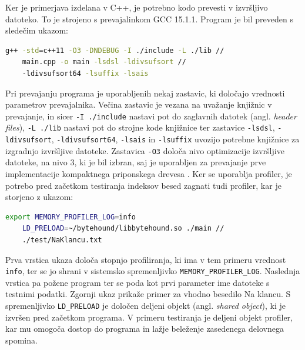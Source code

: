 Ker je primerjava izdelana v C++, je potrebno kodo prevesti v izvršljivo datoteko. To je strojeno s prevajalinkom GCC 15.1.1. Program je bil preveden s sledečim ukazom:
\begin{lstlisting}[language=bash]
    g++ -std=c++11 -O3 -DNDEBUG -I ./include -L ./lib // 
    main.cpp -o main -lsdsl -ldivsufsort //
    -ldivsufsort64 -lsuffix -lsais
\end{lstlisting}
\newpage
Pri prevajanju programa je uporabljenih nekaj zastavic, ki določajo vrednosti parametrov prevajalnika. Večina zastavic je vezana na uvažanje knjižnic v prevajanje, in sicer \verb|-I ./include| nastavi pot do zaglavnih datotek (angl. \textit{header files}), \verb|-L ./lib| nastavi pot do strojne kode knjižnice ter zastavice \verb|-lsdsl|, \verb|-ldivsufsort|, \verb|-ldivsufsort64|,  \verb|-lsais| in \verb|-lsuffix| uvozijo potrebne knjižnice za izgradnjo izvršljive datoteke.
Zastavica \verb|-O3| določa nivo optimizacije izvršljive datoteke, na nivo 3, ki je bil izbran, saj je uporabljen za prevajanje prve implementacije kompaktnega priponskega drevesa \cite{Valimaki2007}. Ker se uporablja profiler, je potrebo pred začetkom testiranja indeksov besed zagnati tudi profiler, kar je storjeno z ukazom:
\begin{lstlisting}[language=bash]
    export MEMORY_PROFILER_LOG=info
    LD_PRELOAD=~/bytehound/libbytehound.so ./main // 
    ./test/NaKlancu.txt 
\end{lstlisting}
Prva vrstica ukaza določa stopnjo profiliranja, ki ima v tem primeru vrednost \verb|info|, ter se jo shrani v sistemsko spremenljivko \verb|MEMORY_PROFILER_LOG|. Naslednja vrstica pa požene program ter se poda kot prvi parameter ime datoteke s testnimi podatki. Zgornji ukaz prikaže primer za vhodno besedilo Na klancu. S spremenljivko \verb|LD_PRELOAD| je določen deljeni objekt (angl. \textit{shared object}), ki je izvršen pred začetkom programa. V primeru testiranja je deljeni objekt profiler, kar mu omogoča dostop do programa in lažje beleženje zasedenega delovnega spomina.

